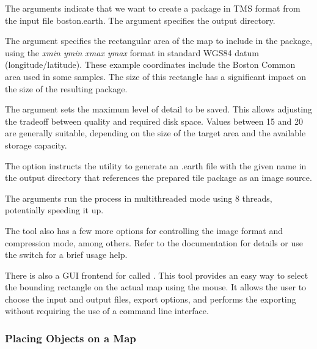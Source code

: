 
The  arguments indicate that we want to create a
package in TMS format from the input file boston.earth. The \ttt{-{}-out
offline-tiles} argument specifies the output directory.

The  argument specifies the rectangular area of the map to
include in the package, using the \textit{xmin ymin xmax ymax} format in
standard WGS84 datum (longitude/latitude). These example coordinates include the
Boston Common area used in some samples. The size of this rectangle has a
significant impact on the size of the resulting package.

The  argument sets the maximum level of detail to be
saved. This allows adjusting the tradeoff between quality and required disk
space. Values between 15 and 20 are generally suitable, depending on the size of
the target area and the available storage capacity.

The  option instructs the utility to
generate an .earth file with the given name in the output directory that
references the prepared tile package as an image source.

The  arguments run the process in multithreaded
mode using 8 threads, potentially speeding it up.

The tool also has a few more options for controlling the image format and
compression mode, among others. Refer to the documentation for details or use
the \ttt{-h} switch for a brief usage help.

\begin{hint}
There is also a GUI frontend for  called
. This tool provides an easy way to select the
bounding rectangle on the actual map using the mouse. It allows the user to
choose the input and output files, export options, and performs the exporting
without requiring the use of a command line interface.
\end{hint}


\subsubsection{Placing Objects on a Map}
\label{sec:graphics:osgearth-placing-objects}

